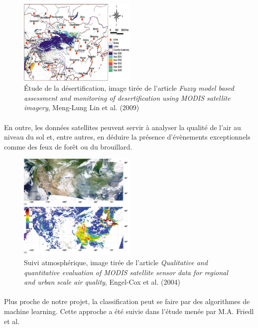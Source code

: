 \documentclass[a4paper,10pt]{article}
\begin{document}
\begin{figure}[H]
  \centering
    \includegraphics[width=0.5\textwidth]{etudeDesertification.png}
  \caption{Étude de la désertification, image tirée de l'article \textit{Fuzzy model based assessment and monitoring of desertification using MODIS satellite imagery}, Meng-Lung Lin et al. (2009)}
  \label{fig:etudeDesert}
\end{figure}

\paragraph{}
En outre, les données satellites peuvent servir à analyser la qualité de l'air au niveau du sol et, entre autres, en déduire la présence d'évènements exceptionnels comme des feux de forêt ou du brouillard\cite{airSurv}. 

\begin{figure}[H]
  \centering
    \includegraphics[width=0.5\textwidth]{surveillanceAtmo.png}
  \caption{Suivi atmosphérique, image tirée de l'article \textit{Qualitative and quantitative evaluation of MODIS satellite sensor data for regional and urban scale air quality}, Engel-Cox et al. (2004)}
  \label{fig:survAtmo}
\end{figure}

\paragraph{}
Plus proche de notre projet, la classification peut se faire par des algorithmes de machine learning. Cette approche a été suivie dans l'étude menée par M.A. Friedl et al\cite{mapping}. 
\end{document}
